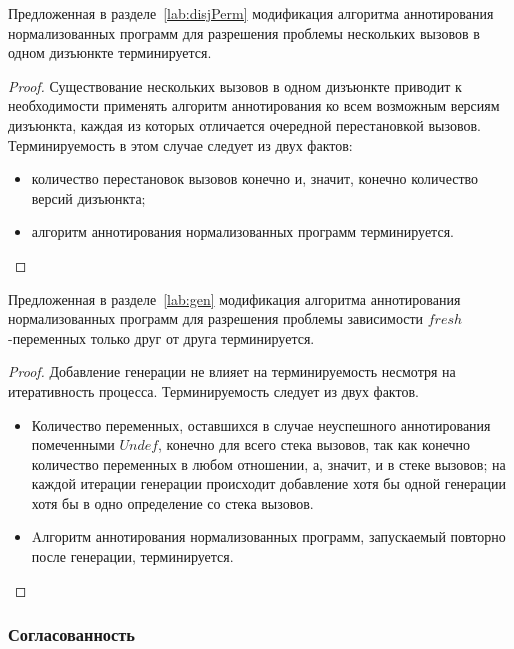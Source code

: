 \begin{theorem} Предложенная в разделе~\ref{lab:disjPerm} модификация алгоритма аннотирования нормализованных программ для разрешения проблемы нескольких вызовов в одном дизъюнкте терминируется.
\end{theorem}

\begin{proof}
Существование нескольких вызовов в одном дизъюнкте приводит к необходимости применять алгоритм аннотирования ко всем возможным версиям дизъюнкта, каждая из которых отличается очередной перестановкой вызовов.
Терминируемость в этом случае следует из двух фактов:
\begin{itemize}
    \item количество перестановок вызовов конечно и, значит, конечно количество версий дизъюнкта;
    \item алгоритм аннотирования нормализованных программ терминируется.
\end{itemize}
\end{proof}

\begin{theorem} 
Предложенная в разделе~\ref{lab:gen} модификация алгоритма аннотирования нормализованных программ для разрешения проблемы зависимости $fresh$-переменных только друг от друга терминируется.
\end{theorem}

\begin{proof}
Добавление генерации не влияет на терминируемость несмотря на итеративность процесса.
Терминируемость следует из двух фактов.
\begin{itemize}
    \item Количество переменных, оставшихся в случае неуспешного аннотирования помеченными $Undef$, конечно для всего стека вызовов, так как конечно количество переменных в любом отношении, а, значит, и в стеке вызовов; на каждой итерации генерации происходит добавление хотя бы одной генерации хотя бы в одно определение со стека вызовов.
    \item Aлгоритм аннотирования нормализованных программ, запускаемый повторно после генерации, терминируется.
\end{itemize}
\end{proof}


\subsubsection{Согласованность}

